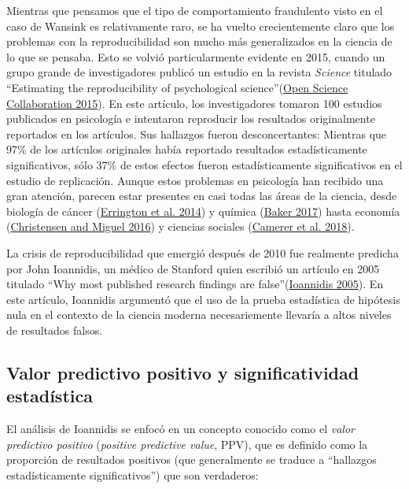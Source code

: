 \documentclass[
  12pt,
]{book}
\theoremstyle{definition}
\theoremstyle{definition}
\theoremstyle{definition}
\theoremstyle{remark}
\begin{document}
Mientras que pensamos que el tipo de comportamiento fraudulento visto en el caso de Wansink es relativamente raro, se ha vuelto crecientemente claro que los problemas con la reproducibilidad son mucho más generalizados en la ciencia de lo que se pensaba. Esto se volvió particularmente evidente en 2015, cuando un grupo grande de investigadores publicó un estudio en la revista \emph{Science} titulado ``Estimating the reproducibility of psychological science''(\protect\hyperlink{ref-open:2015}{Open Science Collaboration 2015}). En este artículo, los investigadores tomaron 100 estudios publicados en psicología e intentaron reproducir los resultados originalmente reportados en los artículos. Sus hallazgos fueron desconcertantes: Mientras que 97\% de los artículos originales había reportado resultados estadísticamente significativos, sólo 37\% de estos efectos fueron estadísticamente significativos en el estudio de replicación. Aunque estos problemas en psicología han recibido una gran atención, parecen estar presentes en casi todas las áreas de la ciencia, desde biología de cáncer (\protect\hyperlink{ref-erri:iorn:gunn:2014}{Errington et al. 2014}) y química (\protect\hyperlink{ref-bake:2017}{Baker 2017}) hasta economía (\protect\hyperlink{ref-NBERw22989}{Christensen and Miguel 2016}) y ciencias sociales (\protect\hyperlink{ref-Camerer2018EvaluatingTR}{Camerer et al. 2018}).

La crisis de reproducibilidad que emergió después de 2010 fue realmente predicha por John Ioannidis, un médico de Stanford quien escribió un artículo en 2005 titulado ``Why most published research findings are false''(\protect\hyperlink{ref-ioan:2005}{Ioannidis 2005}). En este artículo, Ioannidis argumentó que el uso de la prueba estadística de hipótesis nula en el contexto de la ciencia moderna necesariemente llevaría a altos niveles de resultados falsos.

\hypertarget{valor-predictivo-positivo-y-significatividad-estaduxedstica}{%
\subsection{Valor predictivo positivo y significatividad estadística}\label{valor-predictivo-positivo-y-significatividad-estaduxedstica}}

El análisis de Ioannidis se enfocó en un concepto conocido como el \emph{valor predictivo positivo} (\emph{positive predictive value}, PPV), que es definido como la proporción de resultados positivos (que generalmente se traduce a ``hallazgos estadísticamente significativos'') que son verdaderos:
\end{document}
